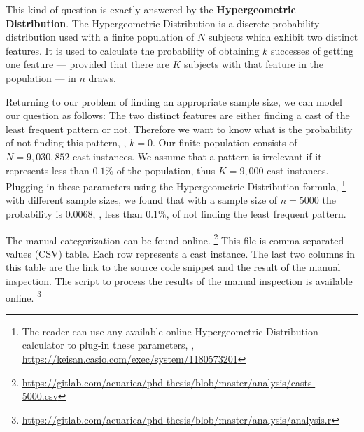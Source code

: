%
This kind of question is exactly answered by the \textbf{Hypergeometric Distribution}.
The Hypergeometric Distribution is a discrete probability distribution used with a finite population of $N$ subjects
%
%
which exhibit two distinct features.
It is used to calculate the probability of obtaining $k$ successes of getting one feature --- provided that there are $K$ subjects with that feature in the population --- in $n$ draws.

Returning to our problem of finding an appropriate sample size, we can model our question as follows:
The two distinct features are either finding a cast of the least frequent pattern or not.
Therefore we want to know what is the probability of not finding this pattern, \ie, $k = 0$.
Our finite population consists of $N = 9,030,852$ cast instances.
%
%
We assume that a pattern is irrelevant if it represents less than $0.1\%$ of the population, thus $K = 9,000$ cast instances.
Plugging-in these parameters using the Hypergeometric Distribution formula,%
\footnote{The reader can use any available online Hypergeometric Distribution calculator to plug-in these parameters, \eg, \url{https://keisan.casio.com/exec/system/1180573201}}
with different sample sizes,
%
%
we found that with a sample size of $n = 5000$ the probability is $0.0068$,
\ie, less than $0.1 \%$, of not finding the least frequent pattern.

%
The manual categorization can be found online.%
\footnote{\url{https://gitlab.com/acuarica/phd-thesis/blob/master/analysis/casts-5000.csv}}
This file is comma-separated values (CSV) table.
Each row represents a cast instance.
The last two columns in this table are the link to the source code snippet and the result of the manual inspection.
The script to process the results of the manual inspection is available online.%
\footnote{\url{https://gitlab.com/acuarica/phd-thesis/blob/master/analysis/analysis.r}}



